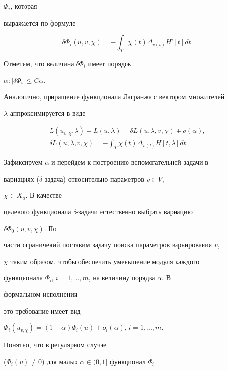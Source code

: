 $\Phi_i$, которая 


выражается по формуле 


$$ 


\delta\Phi_i(u,v,\chi)=-\int_T\chi(t)\Delta_{v(t)} 


H^i[t]dt. 


$$ 


Отметим, что величина $\delta\Phi_i$ имеет порядок 


$\alpha:|\delta\Phi_i|\le C\alpha$. 


 


Аналогично, приращение функционала Лагранжа с вектором множителей 


$\lambda$ аппроксимируется в виде 


\begin{gather*} 


L(u_{v,\chi},\lambda)-L(u,\lambda)=\delta L(u,\lambda,v,\chi) 


+o(\alpha),\\ 


\delta L(u,\lambda,v,\chi)=-\int_T\chi(t)\Delta_{v(t)} 


H[t,\lambda]dt. 


\end{gather*} 


 


Зафиксируем $\alpha$ и перейдем к построению вспомогательной задачи в 


вариациях ($\delta$-задача) относительно параметров $v\in V$, 


$\chi\in X_\alpha$. В качестве 


целевого функционала $\delta$-задачи естественно выбрать вариацию 


$\delta\Phi_0(u,v,\chi)$. По 


части ограничений поставим задачу поиска параметров варьирования $v$, 


$\chi$ таким образом, чтобы обеспечить уменьшение модуля каждого 


функционала $\Phi_i$, $i=1,\dotsc,m$, на величину порядка $\alpha$. В 


формальном исполнении 


это требование имеет вид 


$\Phi_i(u_{v,\chi})=(1-\alpha)\Phi_i(u)+o_i(\alpha)$, $i=1,\dotsc,m$. 


Понятно, что в регулярном случае 


($\Phi_i(u)\ne 0$) для малых $\alpha\in(0,1]$ функционал $\Phi_i$ 


